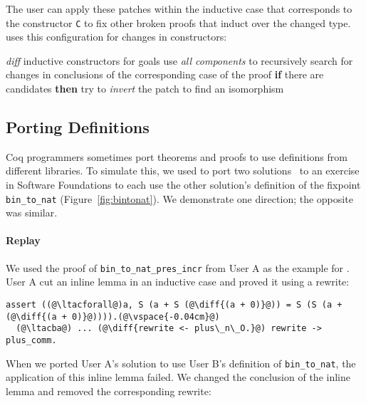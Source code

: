 The user can apply these patches within the inductive case that corresponds to the constructor \lstinline{C}
to fix other broken proofs that induct over the changed type. 
\sysname uses this configuration for changes in constructors:

\begin{algorithm}
\footnotesize
\begin{algorithmic}[1]
    \STATE \textit{diff} inductive constructors for goals
    \STATE use \textit{all components} to recursively search for changes in conclusions of the corresponding case of the proof
    \STATE \textbf{if} there are candidates \textbf{then}
    \STATE \hspace*{1em} try to \textit{invert} the patch to find an isomorphism 
\end{algorithmic}
\end{algorithm}

\subsection{Porting Definitions}
\label{sec:foundations}

Coq programmers sometimes port theorems and proofs to use definitions
from different libraries.
To simulate this, we used \sysname to port two solutions~\cite{usera, userb}
to an exercise in Software Foundations to each use the other solution's definition of the fixpoint \lstinline{bin_to_nat} (Figure~\ref{fig:bintonat}).
We demonstrate one direction; the opposite was similar.

\paragraph{Replay} We used the proof of \lstinline{bin_to_nat_pres_incr} from User A as the example for \sysname.
User A cut an inline lemma in an inductive case and proved it using a rewrite:

\begin{lstlisting}[language=coq]
  assert ((@\ltacforall@)a, S (a + S (@\diff{(a + 0)}@)) = S (S (a + (@\diff{(a + 0)}@)))).(@\vspace{-0.04cm}@)
  (@\ltacba@) ... (@\diff{rewrite <- plus\_n\_O.}@) rewrite -> plus_comm.
\end{lstlisting} %

When we ported User A's solution to use User B's definition of \lstinline{bin_to_nat}, 
the application of this inline lemma failed. We changed the conclusion of the inline lemma 
and removed the corresponding rewrite:

